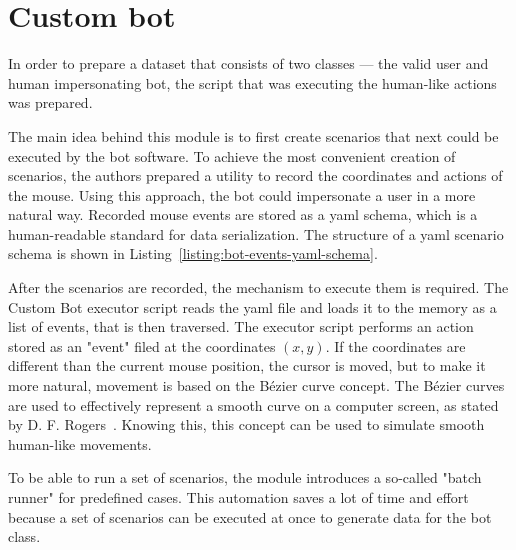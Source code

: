 \section{Custom bot}\label{sec:custom-bot}
In order to prepare a dataset that consists of two classes --- the valid user and human impersonating bot, the script that was executing the human-like actions was prepared.

The main idea behind this module is to first create scenarios that next could be executed by the bot software.
To achieve the most convenient creation of scenarios, the authors prepared a utility to record the coordinates and actions of the mouse.
Using this approach, the bot could impersonate a user in a more natural way.
Recorded mouse events are stored as a \gls{yaml} schema, which is a human-readable standard for data serialization.
The structure of a \gls{yaml} scenario schema is shown in Listing~\ref{listing:bot-events-yaml-schema}.


After the scenarios are recorded, the mechanism to execute them is required.
The Custom Bot executor script reads the \gls{yaml} file and loads it to the memory as a list of events, that is then traversed.
The executor script performs an action stored as an "event" filed at the coordinates $(x, y)$.
If the coordinates are different than the current mouse position, the cursor is moved, but to make it more natural, movement is based on the Bézier curve concept.
The Bézier curves are used to effectively represent a smooth curve on a computer screen, as stated by D. F. Rogers~\cite{bezier-curves}.
Knowing this, this concept can be used to simulate smooth human-like movements.

To be able to run a set of scenarios, the module introduces a so-called "batch runner" for predefined cases.
This automation saves a lot of time and effort because a set of scenarios can be executed at once to generate data for the bot class.

